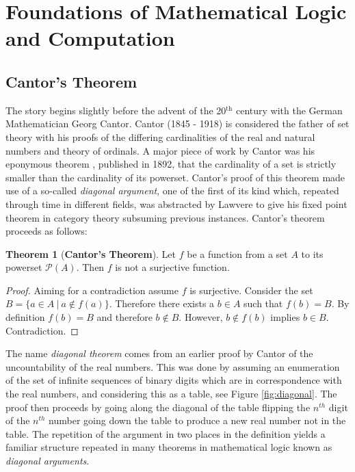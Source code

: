 \theoremstyle{definition}
\newtheorem{theorem}{Theorem}
\newtheorem*{theorem*}{Theorem}
\newtheorem{definition}{Definition}
\newtheorem*{definition*}{Definition}

\section{Foundations of Mathematical Logic and Computation}

\subsection{Cantor's Theorem}

The story begins slightly before the advent of the 20$^{\textrm{th}}$ century
with the German Mathematician Georg Cantor. Cantor (1845 - 1918) is considered
the father of set theory with his proofs of the differing cardinalities of the
real and natural numbers and theory of ordinals. A major piece of work by Cantor
was his eponymous theorem \cite{cantor1892ueber}, published in 1892, that the
cardinality of a set is strictly smaller than the cardinality of its powerset.
Cantor's proof of this theorem made use of a so-called \textit{diagonal
argument}, one of the first of its kind which, repeated through time in
different fields, was abstracted by Lawvere to give his fixed point theorem in
category theory subsuming previous instances. Cantor's theorem proceeds as
follows:

\begin{theorem*}[\textbf{Cantor's Theorem}]
    Let $f$ be a function from a set $A$ to its powerset $\mathcal{P}(A)$. Then
    $f$ is not a surjective function.
\end{theorem*}

\begin{proof}
    Aiming for a contradiction assume $f$ is surjective. Consider the set $B =
    \{ a \in A \: | \: a \not\in f(a) \}$. Therefore there exists a $b \in A$
    such that $f(b)=B$. By definition $f(b) = B$ and therefore $b \not\in B$.
    However, $b \not\in f(b)$ implies $b \in B$. Contradiction.
\end{proof}

The name \textit{diagonal theorem} comes from an earlier proof by Cantor of the
uncountability of the real numbers. This was done by assuming an enumeration of
the set of infinite sequences of binary digits which are in correspondence with
the real numbers, and considering this as a table, see Figure
\ref{fig:diagonal}. The proof then proceeds by going along the diagonal of the
table flipping the $n^{th}$ digit of the $n^{th}$ number going down the table to
produce a new real number not in the table. The repetition of the argument in
two places in the definition yields a familiar structure repeated in many
theorems in mathematical logic known as \textit{diagonal arguments}.

